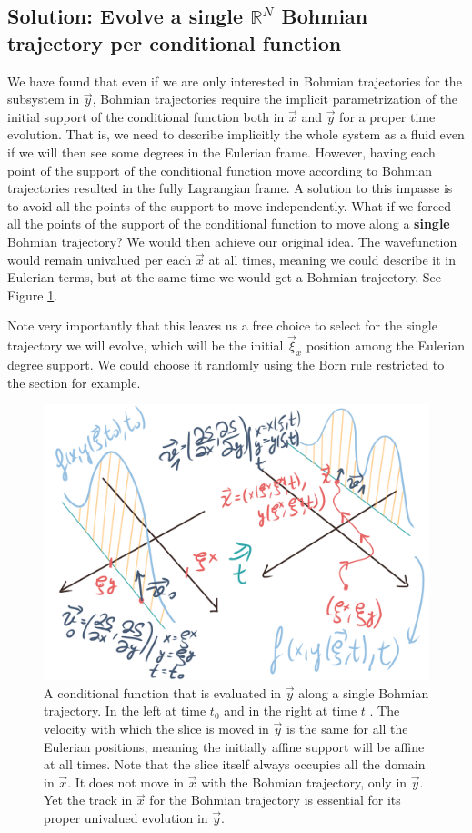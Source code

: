 \documentclass[11pt, a4paper]{article} %
\newcommand{\R}{\mathbb{R}} %
\DeclareRobustCommand{\mybox}[2][gray!10]{%
\begin{tcolorbox}[   %
        left=0.2cm,
        right=0.2cm,
        top=0.15cm,
        bottom=0.15cm,
        colback=#1,
        colframe=#1,
        width=\dimexpr\textwidth\relax, 
        enlarge left by=0mm,
        boxsep=5pt,
        arc=0pt,outer arc=0pt,
        ]
        #2
\end{tcolorbox}
}
\begin{document}
\mybox{
\subsection*{Solution: Evolve a single $\R^N$ Bohmian trajectory per conditional function}
We have found that even if we are only interested in Bohmian trajectories for the subsystem in $\vec{y}$, Bohmian trajectories require the implicit parametrization of the initial support of the conditional function both in $\vec{x}$ and $\vec{y}$ for a proper time evolution. That is, we need to describe implicitly the whole system as a fluid even if we will then see some degrees in the Eulerian frame. However, having each point of the support of the conditional function move according to Bohmian trajectories resulted in the fully Lagrangian frame. A solution to this impasse is to avoid all the points of the support to move independently. What if we forced all the points of the support of the conditional function to move along a {\bf single} Bohmian trajectory? We would then achieve our original idea. The wavefunction would remain univalued per each $\vec{x}$ at all times, meaning we could describe it in Eulerian terms, but at the same time we would get a Bohmian trajectory. See Figure \ref{fig:singleTraj}. 

Note very importantly that this leaves us a free choice to select   for the single trajectory we will evolve, which will be the initial $\vec{\xi}_x$ position among the Eulerian degree support. We could choose it randomly using the Born rule restricted to the section for example.

}
\begin{figure}[h!]
  \centering
    \includegraphics[width=0.64\linewidth]{moving_bohmian.png}
  \caption{A conditional function that is evaluated in $\vec{y}$ along a single Bohmian trajectory. In the left at time $t_0$ and in the right at time $t$ . The velocity with which the slice is moved in $\vec{y}$ is the same for all the Eulerian positions, meaning the initially affine support will be affine at all times. Note that the slice itself always occupies all the domain in $\vec{x}$. It does not move in $\vec{x}$ with the Bohmian trajectory, only in $\vec{y}$. Yet the track in $\vec{x}$ for the Bohmian trajectory is essential for its proper univalued evolution in $\vec{y}$. }
  \label{fig:singleTraj}
\end{figure}
\end{document}
